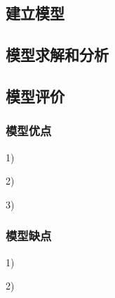 \documentclass[nocover]{cumcmart}%
\begin{document}
\subsection{建立模型}

\subsection{模型求解和分析}

\subsection{模型评价}
\subsubsection{模型优点}
1)	

2)	

3)	

\subsubsection{模型缺点}
1)	

2)	




\end{document}
